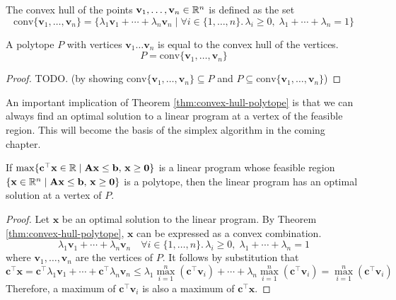 \begin{definition} 
    The convex hull of the points $\mathbf{v}_1,\ldots,\mathbf{v}_n \in \mathbb{R}^n$ is defined as the set
    $$
    \mathrm{conv} \{\mathbf{v}_1,\ldots,\mathbf{v}_n\} = \{ \lambda_1 \mathbf{v}_1 + \cdots + \lambda_n \mathbf{v}_n \mid \forall i \in \{1,\ldots,n\}.\, \lambda_i \geq 0,\; \lambda_1+\cdots+\lambda_n = 1 \}
    $$
\end{definition}

\begin{theorem} \label{thm:convex-hull-polytope}
    A polytope $P$ with vertices $\mathbf{v}_1 \ldots \mathbf{v}_n$ is equal to the convex hull of the vertices.
    $$
    P = \mathrm{conv} \{\mathbf{v}_1,\ldots,\mathbf{v}_n\}
    $$
\end{theorem}

\begin{proof}
    TODO. (by showing $\mathrm{conv} \{\mathbf{v}_1,\ldots,\mathbf{v}_n\} \subseteq P$ and $P \subseteq \mathrm{conv} \{\mathbf{v}_1,\ldots,\mathbf{v}_n\}$)
\end{proof}

An important implication of Theorem \ref{thm:convex-hull-polytope} is that we can always find an optimal solution to a linear program at a vertex of the feasible region. This will become the basis of the simplex algorithm in the coming chapter.

\begin{theorem}
    If $\max \{ \mathbf{c}^\top \mathbf{x} \in \mathbb{R} \mid \mathbf{A}\mathbf{x} \leq \mathbf{b},\, \mathbf{x} \geq \textbf{0} \}$ is a linear program whose feasible region $\{ \mathbf{x} \in \mathbb{R}^n \mid \mathbf{A}\mathbf{x} \leq \mathbf{b},\, \mathbf{x} \geq \textbf{0} \}$ is a polytope, then the linear program has an optimal solution at a vertex of $P$.
\end{theorem}

\begin{proof}
    Let $\mathbf{x}$ be an optimal solution to the linear program. By Theorem \ref{thm:convex-hull-polytope}, $\mathbf{x}$ can be expressed as a convex combination.
    $$
    \lambda_1 \mathbf{v}_1 + \cdots + \lambda_n \mathbf{v}_n \quad \forall i \in \{1,\ldots,n\}.\, \lambda_i \geq 0,\; \lambda_1+\cdots+\lambda_n = 1
    $$
    where $\mathbf{v}_1,\ldots,\mathbf{v}_n$ are the vertices of $P$. It follows by substitution that
    $$
    \mathbf{c}^\top \mathbf{x} = \mathbf{c}^\top \lambda_1 \mathbf{v}_1 + \cdots + \mathbf{c}^\top \lambda_n \mathbf{v}_n \leq  \lambda_1 \max_{i=1}^n (\mathbf{c}^\top \mathbf{v}_i) + \cdots + \lambda_n \max_{i=1}^n (\mathbf{c}^\top \mathbf{v}_i) = \max_{i=1}^n (\mathbf{c}^\top \mathbf{v}_i)
    $$
    Therefore, a maximum of $\mathbf{c}^\top \mathbf{v}_i$ is also a maximum of $\mathbf{c}^\top \mathbf{x}$.
\end{proof}